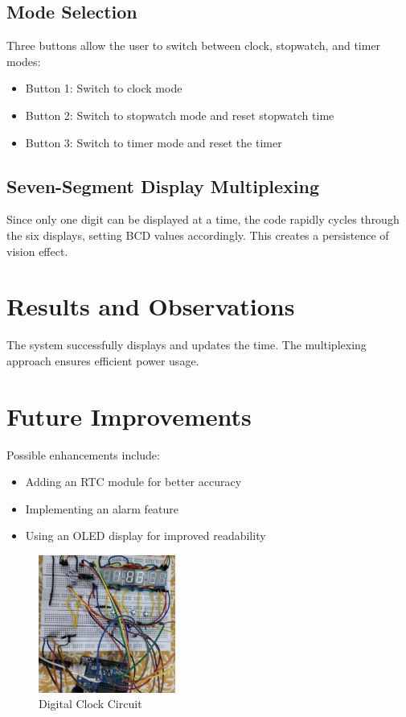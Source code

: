 \documentclass[journal]{IEEEtran}
\numberwithin{equation}{enumi}
\numberwithin{figure}{enumi}
\begin{document}
\subsection{Mode Selection}
Three buttons allow the user to switch between clock, stopwatch, and timer modes:
\begin{itemize}
\item Button 1: Switch to clock mode
\item Button 2: Switch to stopwatch mode and reset stopwatch time
\item Button 3: Switch to timer mode and reset the timer
\end{itemize}

\subsection{Seven-Segment Display Multiplexing}
Since only one digit can be displayed at a time, the code rapidly cycles through the six displays, setting BCD values accordingly. This creates a persistence of vision effect.

\section*{Results and Observations}
The system successfully displays and updates the time. The multiplexing approach ensures efficient power usage.

\section*{Future Improvements}
Possible enhancements include:
\begin{itemize}
\item Adding an RTC module for better accuracy
\item Implementing an alarm feature
\item Using an OLED display for improved readability
\end{itemize}
\begin{figure}[H]
    \centering
    \includegraphics[width=0.4\textwidth]{clk.jpeg}
    \caption*{Digital Clock Circuit}
\end{figure}
\end{document}
